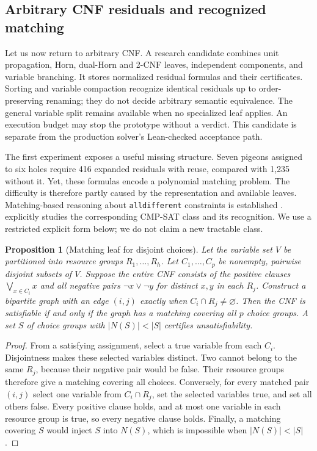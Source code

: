 \documentclass[11pt,a4paper]{article}
\numberwithin{equation}{section}
\theoremstyle{plain}
\newtheorem{proposition}[lemma]{Proposition}
\theoremstyle{definition}
\theoremstyle{remark}
\begin{document}
\subsection{Arbitrary CNF residuals and recognized matching}
\label{sec:cnf-residual-candidate}

Let us now return to arbitrary CNF. A research candidate combines unit propagation, Horn, dual-Horn and 2-CNF leaves, independent components, and variable branching. It stores normalized residual formulas and their certificates. Sorting and variable compaction recognize identical residuals up to order-preserving renaming; they do not decide arbitrary semantic equivalence. The general variable split remains available when no specialized leaf applies. An execution budget may stop the prototype without a verdict. This candidate is separate from the production solver's Lean-checked acceptance path.

The first experiment exposes a useful missing structure. Seven pigeons assigned to six holes require 416 expanded residuals with reuse, compared with 1,235 without it. Yet, these formulas encode a polynomial matching problem. The difficulty is therefore partly caused by the representation and available leaves. Matching-based reasoning about \texttt{alldifferent} constraints is established \citep{regin1994}. \citet{lenchner2019} explicitly studies the corresponding CMP-SAT class and its recognition. We use a restricted explicit form below; we do not claim a new tractable class.

\begin{proposition}[Matching leaf for disjoint choices]
\label{prop:matching-leaf}
Let the variable set $V$ be partitioned into resource groups $R_1,\ldots,R_h$. Let $C_1,\ldots,C_p$ be nonempty, pairwise disjoint subsets of $V$. Suppose the entire CNF consists of the positive clauses $\bigvee_{x\in C_i}x$ and all negative pairs $\neg x\lor\neg y$ for distinct $x,y$ in each $R_j$. Construct a bipartite graph with an edge $(i,j)$ exactly when $C_i\cap R_j\neq\varnothing$. Then the CNF is satisfiable if and only if the graph has a matching covering all $p$ choice groups. A set $S$ of choice groups with $|N(S)|<|S|$ certifies unsatisfiability.
\end{proposition}

\begin{proof}
From a satisfying assignment, select a true variable from each $C_i$. Disjointness makes these selected variables distinct. Two cannot belong to the same $R_j$, because their negative pair would be false. Their resource groups therefore give a matching covering all choices. Conversely, for every matched pair $(i,j)$ select one variable from $C_i\cap R_j$, set the selected variables true, and set all others false. Every positive clause holds, and at most one variable in each resource group is true, so every negative clause holds. Finally, a matching covering $S$ would inject $S$ into $N(S)$, which is impossible when $|N(S)|<|S|$.
\end{proof}
\end{document}
